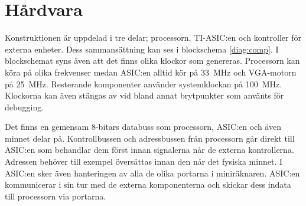 \documentclass[main.tex]{subfiles}
\begin{document}
\section{Hårdvara}
Konstruktionen är uppdelad i tre delar; processorn, TI-ASIC:en och kontroller
för externa enheter. Dess sammansättning kan ses i blockschema \ref{diag:comp}.
I blockschemat syns även att det finns olika klockor som genereras. Processorn
kan köra på olika frekvenser medan ASIC:en alltid kör på \SI{33}{\mega\hertz}
och VGA-motorn på \SI{25}{\mega\hertz}. Resterande komponenter använder
systemklockan på \SI{100}{\mega\hertz}. Klockorna kan även stängas av vid bland
annat brytpunkter som använts för debugging.

Det finns en gemensam 8-bitars databuss som processorn, ASIC:en och även minnet
delar på. Kontrollbussen och adressbussen från processorn går direkt till
ASIC:en som behandlar dem först innan signalerna når de externa kontrollerna.
Adressen behöver till exempel översättas innan den når det fysiska minnet. I
ASIC:en sker även hanteringen av alla de olika portarna i miniräknaren. ASIC:en
kommunicerar i sin tur med de externa komponenterna och skickar dess indata
till processorn via portarna.




\end{document}
